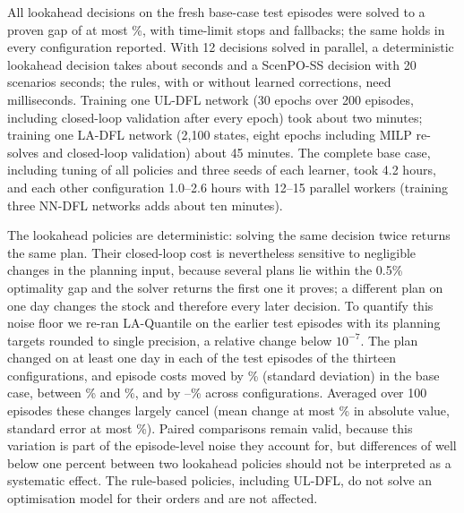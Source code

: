 All \ndecisionsBaseFresh{} lookahead decisions on the fresh base-case test episodes were solved to a proven gap of at most \maxgapBaseFresh\%, with \nonoptBaseFresh{} time-limit stops and \fallbacksBaseFresh{} fallbacks; the same holds in every configuration reported. With 12 decisions solved in parallel, a deterministic lookahead decision takes about \secsLAQBaseFresh{} seconds and a ScenPO-SS decision with 20 scenarios \secsScenPOBaseFresh{} seconds; the rules, with or without learned corrections, need milliseconds. Training one UL-DFL network (30 epochs over 200 episodes, including closed-loop validation after every epoch) took about two minutes; training one LA-DFL network (2,100 states, eight epochs including MILP re-solves and closed-loop validation) about 45 minutes. The complete base case, including tuning of all policies and three seeds of each learner, took 4.2 hours, and each other configuration 1.0--2.6 hours with 12--15 parallel workers (training three NN-DFL networks adds about ten minutes).

The lookahead policies are deterministic: solving the same decision twice returns the same plan. Their closed-loop cost is nevertheless sensitive to negligible changes in the planning input, because several plans lie within the 0.5\% optimality gap and the solver returns the first one it proves; a different plan on one day changes the stock and therefore every later decision. To quantify this noise floor we re-ran LA-Quantile on the earlier test episodes with its planning targets rounded to single precision, a relative change below $10^{-7}$. The plan changed on at least one day in each of the \noiseN{} test episodes of the thirteen configurations, and episode costs moved by \noiseSDBase\% (standard deviation) in the base case, between \noiseMinBase\% and \noiseMaxBase\%, and by \noiseSDLo--\noiseSDHi\% across configurations. Averaged over 100 episodes these changes largely cancel (mean change at most \noiseAbsMeanMax\% in absolute value, standard error at most \noiseSEHi\%). Paired comparisons remain valid, because this variation is part of the episode-level noise they account for, but differences of well below one percent between two lookahead policies should not be interpreted as a systematic effect. The rule-based policies, including UL-DFL, do not solve an optimisation model for their orders and are not affected.


